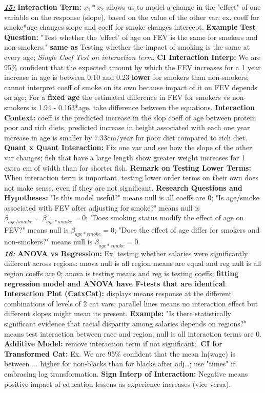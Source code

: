 \documentclass[8pt]{extarticle}
\begin{document}
\textit{\textbf{\underline{15:}}}
\textbf{Interaction Term:} $x_1*x_2$ allows us to model a change in the "effect" 
of one variable on the response (slope), based on the value of the other var;
ex. coeff for smoke*age changes slope and coeff for smoke changes intercept.
\textbf{Example Test Question:} "Test whether the 'effect' of age on FEV is the 
same for smokers and non-smokers." \textbf{same as} Testing whether the impact 
of smoking is the same at every age; \textit{Single Coef Test on interaction term}.
\textbf{CI Interaction Interp:} We are 95\% confident that the expected amount 
by which the FEV increases for a 1 year increase in age is between 0.10 and 0.23
\textbf{lower} for smokers than non-smokers; cannot interpret coeff of smoke 
on its own because impact of it on FEV depends on age; For a \textbf{fixed age} 
the estimated difference in FEV for smokers vs non-smokers is 1.94 - 0.163*age, 
take difference between the equations.
\textbf{Interaction Context:} coeff is the predicted increase in the slop coeff 
of age between protein poor and rich diets, predicted increase in height 
associated with each one year increase in age is smaller by 7.33cm/year for poor 
diet compared to rich diet.
\textbf{Quant x Quant Interaction:} Fix one var and see how the slope of the
other var changes; fish that have a large length show greater weight increases 
for 1 extra cm of width than for shorter fish.
\textbf{Remark on Testing Lower Terms:} When interaction term is important, 
testing lower order terms on their own does not make sense, even if they are not 
significant.
\textbf{Research Questions and Hypotheses:} "Is this model useful?" means 
null is all coeffs are 0; "Is age/smoke associated with FEV after adjusting for
smoke?" means null is $\beta_{age/smoke} = \beta_{age*smoke} = 0$; "Does 
smoking status modify the effect of age on FEV?" means null is $\beta_{age*smoke}
= 0$; "Does the effect of age differ for smokers and non-smokers?" means null is
$\beta_{age*smoke} = 0$.\\

\textit{\textbf{\underline{16:}}}
\textbf{ANOVA vs Regression:} Ex. testing whether salaries were significantly 
different across regions: anova null is all region means are equal and reg null 
is all region coeffs are 0; anova is testing means and reg is testing coeffs; 
\textbf{fitting regression model and ANOVA have F-tests that are identical}.
\textbf{Interaction Plot (CatxCat):} displays means response at the different 
combinations of levels of 2 cat vars; parallel lines means no interaction 
effect but different slopes might mean its present.
\textbf{Example:} "Is there statistically significant evidence that racial 
disparity among salaries depends on regions?" means test interaction between 
race and region; null is all interaction terms are 0.
\textbf{Additive Model:} remove interaction term if not significant;.
\textbf{CI for Transformed Cat:} Ex. We are 95\% confident that the mean 
ln(wage) is between ... higher for non-blacks than for blacks after adj\dots;
use "times" if embracing log transformation.
\textbf{Sign Interp of Interaction:} Negative means positive impact of education 
lessens as experience increases (vice versa).
\end{document}
